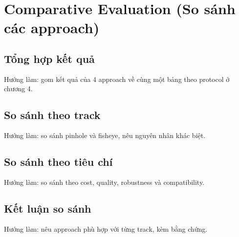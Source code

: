 \chapter{Comparative Evaluation (So sánh các approach)}

\section{Tổng hợp kết quả}

Hướng làm: gom kết quả của 4 approach về cùng một bảng theo protocol ở chương 4.

\section{So sánh theo track}

Hướng làm: so sánh pinhole và fisheye, nêu nguyên nhân khác biệt.

\section{So sánh theo tiêu chí}

Hướng làm: so sánh theo cost, quality, robustness và compatibility.

\section{Kết luận so sánh}

Hướng làm: nêu approach phù hợp với từng track, kèm bằng chứng.
